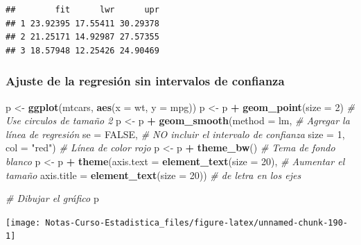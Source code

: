\documentclass[
  12pt,
]{book}
\newenvironment{Shaded}{\begin{snugshade}}{\end{snugshade}}
\newcommand{\CommentTok}[1]{\textcolor[rgb]{0.56,0.35,0.01}{\textit{#1}}}
\newcommand{\DataTypeTok}[1]{\textcolor[rgb]{0.13,0.29,0.53}{#1}}
\newcommand{\DecValTok}[1]{\textcolor[rgb]{0.00,0.00,0.81}{#1}}
\newcommand{\KeywordTok}[1]{\textcolor[rgb]{0.13,0.29,0.53}{\textbf{#1}}}
\newcommand{\NormalTok}[1]{#1}
\newcommand{\OperatorTok}[1]{\textcolor[rgb]{0.81,0.36,0.00}{\textbf{#1}}}
\newcommand{\OtherTok}[1]{\textcolor[rgb]{0.56,0.35,0.01}{#1}}
\newcommand{\StringTok}[1]{\textcolor[rgb]{0.31,0.60,0.02}{#1}}
\theoremstyle{definition}
\theoremstyle{definition}
\theoremstyle{definition}
\theoremstyle{remark}
\begin{document}
\begin{verbatim}
##        fit      lwr      upr
## 1 23.92395 17.55411 30.29378
## 2 21.25171 14.92987 27.57355
## 3 18.57948 12.25426 24.90469
\end{verbatim}

\hypertarget{ajuste-de-la-regresiuxf3n-sin-intervalos-de-confianza}{%
\subsubsection{Ajuste de la regresión sin intervalos de confianza}\label{ajuste-de-la-regresiuxf3n-sin-intervalos-de-confianza}}

\begin{Shaded}
\begin{Highlighting}[]
\NormalTok{p <-}\StringTok{ }\KeywordTok{ggplot}\NormalTok{(mtcars, }\KeywordTok{aes}\NormalTok{(}\DataTypeTok{x =}\NormalTok{ wt, }\DataTypeTok{y =}\NormalTok{ mpg)) }
\NormalTok{p <-}\StringTok{ }\NormalTok{p }\OperatorTok{+}\StringTok{ }\KeywordTok{geom_point}\NormalTok{(}\DataTypeTok{size =} \DecValTok{2}\NormalTok{)       }\CommentTok{# Use circulos de tamaño 2}
\NormalTok{p <-}\StringTok{ }\NormalTok{p }\OperatorTok{+}\StringTok{ }\KeywordTok{geom_smooth}\NormalTok{(}\DataTypeTok{method =}\NormalTok{ lm,   }\CommentTok{# Agregar la línea de regresión }
              \DataTypeTok{se =} \OtherTok{FALSE}\NormalTok{,           }\CommentTok{# NO incluir el intervalo de confianza   }
              \DataTypeTok{size =} \DecValTok{1}\NormalTok{,}
              \DataTypeTok{col =} \StringTok{"red"}\NormalTok{)          }\CommentTok{# Línea de color rojo }
\NormalTok{p <-}\StringTok{ }\NormalTok{p }\OperatorTok{+}\StringTok{ }\KeywordTok{theme_bw}\NormalTok{()                 }\CommentTok{# Tema de fondo blanco}
\NormalTok{p <-}\StringTok{ }\NormalTok{p }\OperatorTok{+}\StringTok{ }\KeywordTok{theme}\NormalTok{(}\DataTypeTok{axis.text =} \KeywordTok{element_text}\NormalTok{(}\DataTypeTok{size =} \DecValTok{20}\NormalTok{),  }\CommentTok{# Aumentar el tamaño }
               \DataTypeTok{axis.title =} \KeywordTok{element_text}\NormalTok{(}\DataTypeTok{size =} \DecValTok{20}\NormalTok{)) }\CommentTok{# de letra en los ejes}

\CommentTok{# Dibujar el gráfico}
\NormalTok{p   }
\end{Highlighting}
\end{Shaded}

\begin{center}\texttt{[image: Notas-Curso-Estadistica\_files/figure-latex/unnamed-chunk-190-1]} \end{center}
\end{document}
